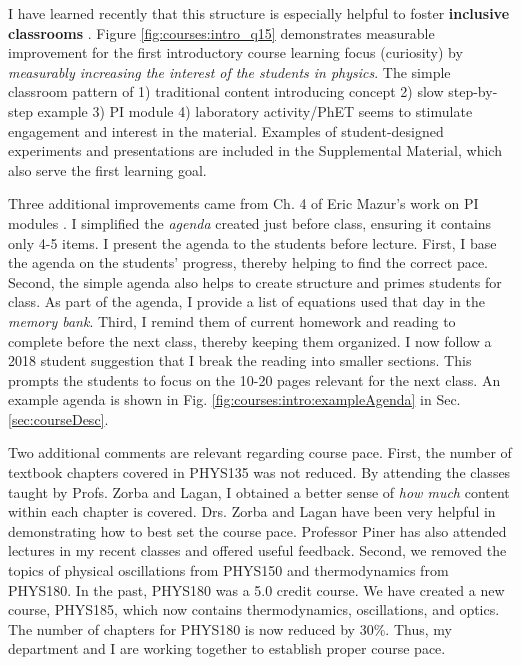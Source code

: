 \documentclass[../../main.tex]{subfiles}
\begin{document}
\clearpage

I have learned recently that this structure is especially helpful to foster \textbf{inclusive classrooms} \cite{inclusive}. Figure \ref{fig:courses:intro_q15} demonstrates measurable improvement for the first introductory course learning focus (curiosity) by \textit{measurably increasing the interest of the students in physics}.  The simple classroom pattern of 1) traditional content introducing concept 2) slow step-by-step example 3) PI module 4) laboratory activity/PhET seems to stimulate engagement and interest in the material.  Examples of student-designed experiments and presentations are included in the Supplemental Material, which also serve the first learning goal.\\ \hspace{0.1cm}

Three additional improvements came from Ch. 4 of Eric Mazur's work on PI modules \cite{mazur}.  I simplified the \textit{agenda} created just before class, ensuring it contains only 4-5 items.  I present the agenda to the students before lecture.  First, I base the agenda on the students' progress, thereby helping to find the correct pace.  Second, the simple agenda also helps to create structure and primes students for class.  As part of the agenda, I provide a list of equations used that day in the \textit{memory bank}.  Third, I remind them of current homework and reading to complete before the next class, thereby keeping them organized.  I now follow a 2018 student suggestion that I break the reading into smaller sections.  This prompts the students to focus on the 10-20 pages relevant for the next class.  An example agenda is shown in Fig. \ref{fig:courses:intro:exampleAgenda} in Sec. \ref{sec:courseDesc}. \\ \hspace{0.1cm}

Two additional comments are relevant regarding course pace.  First, the number of textbook chapters covered in PHYS135 was not reduced.  By attending the classes taught by Profs. Zorba and Lagan, I obtained a better sense of \textit{how much} content within each chapter is covered.  Drs. Zorba and Lagan have been very helpful in demonstrating how to best set the course pace.  Professor Piner has also attended lectures in my recent classes and offered useful feedback.  Second, we removed the topics of physical oscillations from PHYS150 and thermodynamics from PHYS180.  In the past, PHYS180 was a 5.0 credit course.  We have created a new course, PHYS185, which now contains thermodynamics, oscillations, and optics.  The number of chapters for PHYS180 is now reduced by 30\%.  Thus, my department and I are working together to establish proper course pace.  \\ \hspace{0.1cm}
\end{document}
